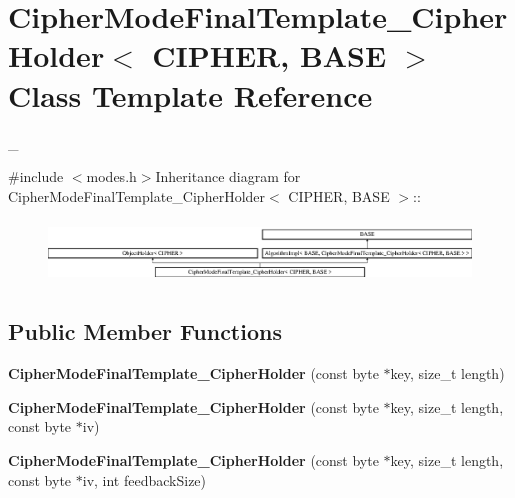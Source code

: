 \hypertarget{class_cipher_mode_final_template___cipher_holder}{
\section{CipherModeFinalTemplate\_\-CipherHolder$<$ CIPHER, BASE $>$ Class Template Reference}
\label{class_cipher_mode_final_template___cipher_holder}
}


\_\-  


{\ttfamily \#include $<$modes.h$>$}Inheritance diagram for CipherModeFinalTemplate\_\-CipherHolder$<$ CIPHER, BASE $>$::\begin{figure}[H]
\begin{center}
\leavevmode
\includegraphics[height=1.66998cm]{class_cipher_mode_final_template___cipher_holder}
\end{center}
\end{figure}
\subsection*{Public Member Functions}
\begin{DoxyCompactItemize}
\item 
\hypertarget{class_cipher_mode_final_template___cipher_holder_ad36933370beefddbe77cebde2773f459}{
{\bfseries CipherModeFinalTemplate\_\-CipherHolder} (const byte $\ast$key, size\_\-t length)}
\label{class_cipher_mode_final_template___cipher_holder_ad36933370beefddbe77cebde2773f459}

\item 
\hypertarget{class_cipher_mode_final_template___cipher_holder_adca35551dece6668f53e28b8f7ff2681}{
{\bfseries CipherModeFinalTemplate\_\-CipherHolder} (const byte $\ast$key, size\_\-t length, const byte $\ast$iv)}
\label{class_cipher_mode_final_template___cipher_holder_adca35551dece6668f53e28b8f7ff2681}

\item 
\hypertarget{class_cipher_mode_final_template___cipher_holder_a1bcfa067b69be65ab13014015b21dfa0}{
{\bfseries CipherModeFinalTemplate\_\-CipherHolder} (const byte $\ast$key, size\_\-t length, const byte $\ast$iv, int feedbackSize)}
\label{class_cipher_mode_final_template___cipher_holder_a1bcfa067b69be65ab13014015b21dfa0}

\end{DoxyCompactItemize}
